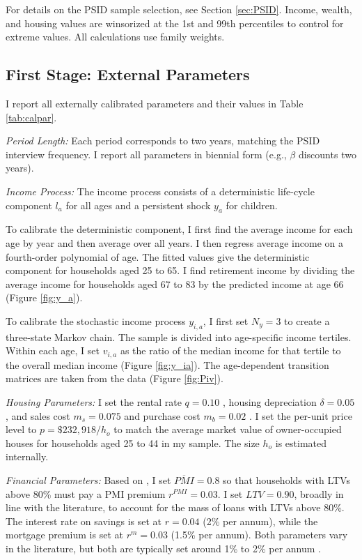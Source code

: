 \documentclass[12pt]{article}
\begin{document}
For details on the PSID sample selection, see Section \ref{sec:PSID}. Income, wealth, and housing values are winsorized at the 1st and 99th percentiles to control for extreme values. All calculations use family weights. 

\subsection{First Stage: External Parameters}
I report all externally calibrated parameters and their values in Table \ref{tab:calpar}.

\textit{Period Length:} Each period corresponds to two years, matching the PSID interview frequency. I report all parameters in biennial form (e.g., $\beta$ discounts two years).

\textit{Income Process:} The income process consists of a deterministic life-cycle component $l_a$ for all ages and a persistent shock $y_a$ for children. 

To calibrate the deterministic component, I first find the average income for each age by year and then average over all years. I then regress average income on a fourth-order polynomial of age. The fitted values give the deterministic component for households aged 25 to 65. I find retirement income by dividing the average income for households aged 67 to 83 by the predicted income at age 66 (Figure \ref{fig:y_a}). 

To calibrate the stochastic income process $y_{i,a}$, I first set $N_y=3$ to create a three-state Markov chain. The sample is divided into age-specific income tertiles. Within each age, I set $v_{i,a}$ as the ratio of the median income for that tertile to the overall median income (Figure \ref{fig:y_ia}). The age-dependent transition matrices are taken from the data (Figure \ref{fig:Piv}).

\textit{Housing Parameters:} I set the rental rate $q=0.10$ \citep{Davis2008}, housing depreciation $\delta=0.05$ \citep{Harding2007}, and sales cost $m_s=0.075$ and purchase cost $m_b=0.02$ \citep{Yang2009}. I set the per-unit price level to $p=\$232,918/h_o$ to match the average market value of owner-occupied houses for households aged 25 to 44 in my sample. The size $h_o$ is estimated internally.

\textit{Financial Parameters:} Based on \cite{goodman2017sixty}, I set $\overline{PMI}=0.8$ so that households with LTVs above 80\% must pay a PMI premium $r^{PMI}=0.03$. I set $LTV=0.90$, broadly in line with the literature, to account for the mass of loans with LTVs above 80\%. The interest rate on savings is set at $r = 0.04$ (2\% per annum), while the mortgage premium is set at $r^m=0.03$ (1.5\% per annum). Both parameters vary in the literature, but both are typically set around 1\% to 2\% per annum \citep[see e.g.,][]{Cocco2005b,Kaplan2020,Paz-Pardo2019}.
\end{document}
